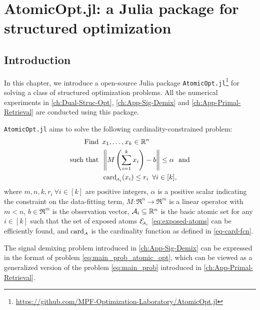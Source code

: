 \chapter{AtomicOpt.jl: a Julia package for structured optimization}
\label{ch:App-AtomicOpt}

\section{Introduction} \label{sec:5-1}
In this chapter, we introduce a open-source Julia package \texttt{AtomicOpt.jl}\footnote{\url{https://github.com/MPF-Optimization-Laboratory/AtomicOpt.jl}} for solving a class of structured optimization problems. All the numerical experiments in \autoref{ch:Dual-Struc-Opt}, \autoref{ch:App-Sig-Demix} and \autoref{ch:App-Primal-Retrieval} are conducted using this package. 

\texttt{AtomicOpt.jl} aims to solve the following cardinality-constrained problem:
\begin{equation} \label{eq:main_prob_atomic_opt} 
\begin{split}
  \mathop{\hbox{\rm Find}}\enspace & x_1, \dots, x_k \in \mathbb{R}^n \\
  \enspace\mathop{\hbox{\rm such that}}\enspace  & \left\|M\left(\sum_{i=1}^k x_i\right) - b \right\| \leq \alpha \enspace\mathop{\hbox{\rm and}}\enspace \\
        & \operatorname{card}_{\!\scriptscriptstyle\mathcal{A}_i}(x_i) \leq r_i \enspace \forall i \in [k],
\end{split}
\end{equation}
where $m, n, k, r_i ~\forall i\in[k]$ are positive integers, $\alpha$ is a positive scalar indicating the constraint on the data-fitting term, $M: \Re^n \to \Re^m$ is a linear operator with $m < n$, $b \in \Re^m$ is the observation vector, $\mathcal{A}_i \subseteq \mathbb{R}^n$ is the basic atomic set for any $i\in[k]$ such that the set of exposed atoms $\mathcal{E}_{\!\scriptscriptstyle\mathcal{A}_i}$ \eqref{eq:exposed-atoms} can be efficiently found, and $\operatorname{card}_{\scriptscriptstyle\mathcal{A}}$ is the cardinality function as defined in \eqref{eq-card-fcn}. 

The signal demixing problem introduced in \autoref{ch:App-Sig-Demix} can be expressed in the format of problem \eqref{eq:main_prob_atomic_opt}, which can be viewed as a generalized version of the problem \eqref{eq:main_prob} introduced in \autoref{ch:App-Primal-Retrieval}. 

